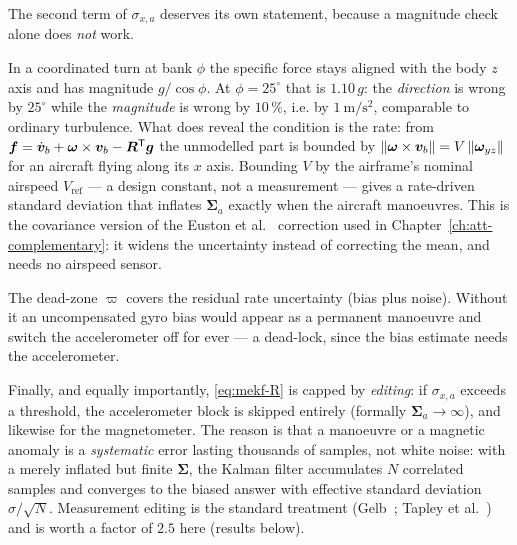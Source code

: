 The second term of $\sigma_{x,a}$ deserves its own statement, because a magnitude check alone does
\emph{not} work.
\begin{remark}\label{rem:mekf-turn}
In a coordinated turn at bank $\phi$ the specific force stays aligned with the body $z$ axis and has
magnitude $g/\cos\phi$. At $\phi=25^\circ$ that is $1.10\,g$: the \emph{direction} is wrong by
$25^\circ$ while the \emph{magnitude} is wrong by $10\,\%$, i.e. by
$\SI{1}{\metre\per\second\squared}$, comparable to ordinary turbulence. What does reveal the
condition is the rate: from $\bm{f}=\dot{\bm{v}}_b+\bm{\omega}\times\bm{v}_b-\bm{R}^{\mathsf{T}}\bm{g}$ the
unmodelled part is bounded by $\left\lVert \bm{\omega}\times\bm{v}_b \right\rVert=V\left\lVert \bm{\omega}_{yz} \right\rVert$ for an
aircraft flying along its $x$ axis. Bounding $V$ by the airframe's nominal airspeed
$V_{\text{ref}}$ --- a design constant, not a measurement --- gives a rate-driven standard deviation
that inflates $\bm{\Sigma}_a$ exactly when the aircraft manoeuvres. This is the covariance version
of the Euston et al.~\cite{euston2008} correction used in Chapter~\ref{ch:att-complementary}: it
widens the uncertainty instead of correcting the mean, and needs no airspeed sensor.
\end{remark}
The dead-zone $\varpi$ covers the residual rate uncertainty (bias plus noise). Without it an
uncompensated gyro bias would appear as a permanent manoeuvre and switch the accelerometer off for
ever --- a dead-lock, since the bias estimate needs the accelerometer.

Finally, and equally importantly, \eqref{eq:mekf-R} is capped by \emph{editing}: if
$\sigma_{x,a}$ exceeds a threshold, the accelerometer block is skipped entirely (formally
$\bm{\Sigma}_a\to\infty$), and likewise for the magnetometer. The reason is that a manoeuvre or a
magnetic anomaly is a \emph{systematic} error lasting thousands of samples, not white noise: with a
merely inflated but finite $\bm{\Sigma}$, the Kalman filter accumulates $N$ correlated samples and
converges to the biased answer with effective standard deviation $\sigma/\sqrt{N}$. Measurement
editing is the standard treatment (Gelb~\cite[Sec.~4.5]{gelb1974};
Tapley et al.~\cite[Sec.~4.15]{tapley2004}) and is worth a factor of $2.5$ here (results below).

